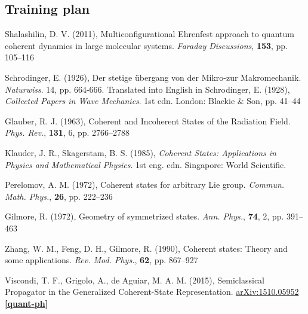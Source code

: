 \documentclass[12pt]{article}
\begin{document}
	\subsection{Training plan}
	
	
	
	
	\begin{thebibliography}{10}

	Shalashilin, D. V. (2011), Multiconfigurational Ehrenfest approach to quantum coherent dynamics in large molecular systems. \textit{Faraday Discussions}, \textbf{153}, pp. 105--116
	
	Schrodinger, E. (1926), Der stetige übergang von der Mikro-zur Makromechanik. \textit{Naturwiss}. 14, pp. 664-666. Translated into English in Schrodinger, E. (1928), \textit{Collected Papers in Wave Mechanics}. 1st edn. London: Blackie \& Son, pp. 41--44
	
	Glauber, R. J. (1963), Coherent and Incoherent States of the Radiation Field. \textit{Phys. Rev.}, \textbf{131}, 6, pp. 2766--2788
	
	Klauder, J. R., Skagerstam, B. S. (1985), \textit{Coherent States: Applications in Physics and Mathematical Physics}. 1st eng. edn. Singapore: World Scientific.
	
	Perelomov, A. M. (1972), Coherent states for arbitrary Lie group. \textit{Commun. Math. Phys.}, \textbf{26}, pp. 222--236
	
	Gilmore, R. (1972), Geometry of symmetrized states. \textit{Ann. Phys.}, \textbf{74}, 2, pp. 391--463
	
	Zhang, W. M., Feng, D. H., Gilmore, R. (1990), Coherent states: Theory and some applications. \textit{Rev. Mod. Phys.}, \textbf{62}, pp. 867--927
	
	Viscondi, T. F., Grigolo, A., de Aguiar, M. A. M. (2015), Semiclassical Propagator in the Generalized Coherent-State Representation. \href{https://doi.org/10.48550/arXiv.1510.05952}{arXiv:1510.05952 \textbf{[quant-ph]}}

	\end{thebibliography}
	
	
	
	
	

	
	
\end{document}
